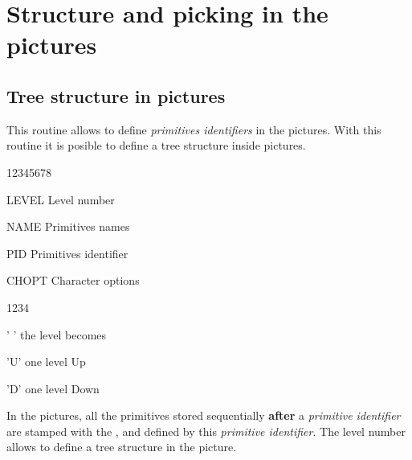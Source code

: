 
\chapter{Structure and picking in the \HIGZ{} pictures}

\section{Tree structure in \HIGZ{} pictures}
\Action
This routine allows to define {\it primitives identifiers} in the 
\HIGZ{} pictures. With this routine it is posible to define a tree 
structure inside \HIGZ{} pictures.
\Pdesc
\begin{DLtt}{12345678}
   \item[LEVEL] Level number
   \item[NAME] Primitives names
   \item[PID] Primitives identifier
   \item[CHOPT] Character options
   \begin{DLtt}{1234}
      \item[' '] the level becomes 
      \item['U'] one level Up
      \item['D'] one level Down
   \end{DLtt}
\end{DLtt}
\par
In the \HIGZ{} pictures, all the primitives stored sequentially {\bf after} a
{\it primitive identifier\/} are stamped with the , 
 and 
defined by this {\it primitive identifier\/}. The level number allows 
to define a tree structure in the \HIGZ{} picture.

